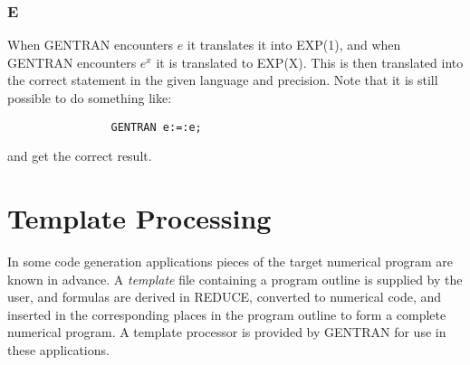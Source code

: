 \subsubsection{E}
 
When GENTRAN encounters $e$ it translates it into EXP(1), and when GENTRAN
encounters
$e^x$ it is translated to EXP(X).  This is then translated
into the correct statement in the given language and precision.  Note that
it is still possible to do something like:
\begin{verbatim}
                GENTRAN e:=:e;
\end{verbatim}
and get the correct result.



\section{Template Processing}\label{GENTRAN:template}

  
In some code generation applications pieces of the target numerical
program are known in advance.  A {\it template} file containing a
program outline is supplied by the user, and formulas are derived in
REDUCE, converted to numerical code, and inserted in the corresponding
places in the program outline to form a complete numerical program.  A
template processor is provided by GENTRAN for use in these
applications.

